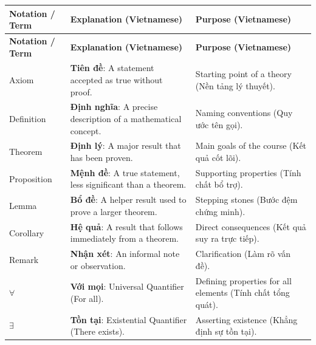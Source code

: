 \begin{longtable}{ | L{0.15\textwidth} | L{0.45\textwidth} | L{0.25\textwidth} | }
    \hline
    \textbf{Notation / Term} & \textbf{Explanation (Vietnamese)} & \textbf{Purpose (Vietnamese)} \\
    \hline
    \endfirsthead
    
    \hline
    \textbf{Notation / Term} & \textbf{Explanation (Vietnamese)} & \textbf{Purpose (Vietnamese)} \\
    \hline
    \endhead

    \hline
    \endfoot

    \hline
    \endlastfoot

    Axiom 
    & \textbf{Tiên đề}: A statement accepted as true without proof. 
    & Starting point of a theory (Nền tảng lý thuyết). \\
    \hline

    Definition 
    & \textbf{Định nghĩa}: A precise description of a mathematical concept. 
    & Naming conventions (Quy ước tên gọi). \\
    \hline

    Theorem 
    & \textbf{Định lý}: A major result that has been proven. 
    & Main goals of the course (Kết quả cốt lõi). \\
    \hline

    Proposition 
    & \textbf{Mệnh đề}: A true statement, less significant than a theorem. 
    & Supporting properties (Tính chất bổ trợ). \\
    \hline

    Lemma 
    & \textbf{Bổ đề}: A helper result used to prove a larger theorem. 
    & Stepping stones (Bước đệm chứng minh). \\
    \hline

    Corollary 
    & \textbf{Hệ quả}: A result that follows immediately from a theorem. 
    & Direct consequences (Kết quả suy ra trực tiếp). \\
    \hline

    Remark 
    & \textbf{Nhận xét}: An informal note or observation. 
    & Clarification (Làm rõ vấn đề). \\
    \hline

    $\forall$ 
    & \textbf{Với mọi}: Universal Quantifier (For all). 
    & Defining properties for all elements (Tính chất tổng quát). \\ 
    \hline

    $\exists$ 
    & \textbf{Tồn tại}: Existential Quantifier (There exists). 
    & Asserting existence (Khẳng định sự tồn tại). \\ 
    \hline


\end{longtable}
